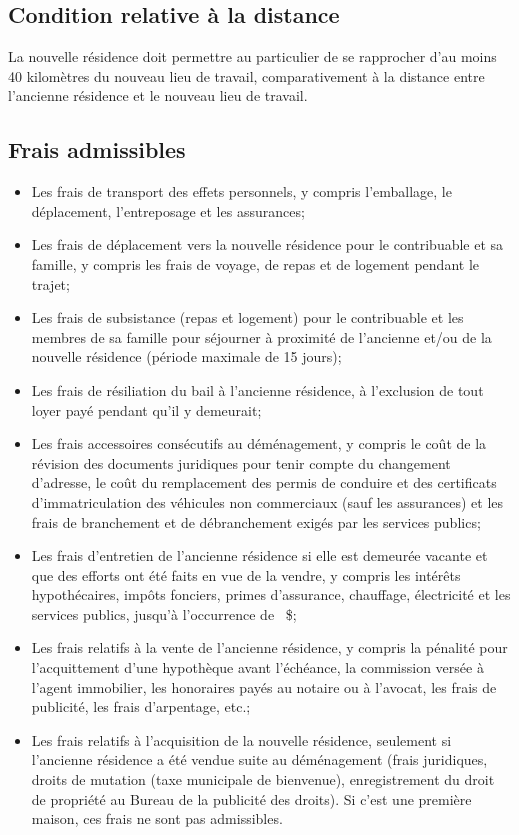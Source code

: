 \subsection{Condition relative à la distance}
La nouvelle résidence doit permettre au particulier de se rapprocher d'au moins 40 kilomètres du nouveau lieu de travail, comparativement à la distance entre l'ancienne résidence et le nouveau lieu de travail.


\subsection{Frais admissibles}
\begin{itemize}[label=]
	\item Les frais de transport des effets personnels, y compris l'emballage, le déplacement, l'entreposage et les assurances;
	\item Les frais de déplacement vers la nouvelle résidence pour le contribuable et sa famille, y compris les frais de voyage, de repas et de logement pendant le trajet;
	\item Les frais de subsistance (repas et logement) pour le contribuable et les membres de sa famille pour séjourner à proximité de l'ancienne et/ou de la nouvelle résidence (période maximale de 15 jours);
	\item Les frais de résiliation du bail à l'ancienne résidence, à l'exclusion de tout loyer payé pendant qu'il y demeurait;
	\item Les frais accessoires consécutifs au déménagement, y compris le coût de la révision des documents juridiques pour tenir compte du changement d'adresse, le coût du remplacement des permis de conduire et des certificats d'immatriculation des véhicules non commerciaux (sauf les assurances) et les frais de branchement et de débranchement exigés par les services publics;
	\item Les frais d'entretien de l'ancienne résidence si elle est demeurée vacante et que des efforts ont été faits en vue de la vendre, y compris les intérêts hypothécaires, impôts fonciers, primes d'assurance, chauffage, électricité et les services publics, jusqu'à l'occurrence de ~\$;
	\item Les frais relatifs à la vente de l'ancienne résidence, y compris la pénalité pour l'acquittement d'une hypothèque avant l'échéance, la commission versée à l'agent immobilier, les honoraires payés au notaire ou à l'avocat, les frais de publicité, les frais d'arpentage, etc.; 
	\item Les frais relatifs à l'acquisition de la nouvelle résidence, seulement si l'ancienne résidence a été vendue suite au déménagement (frais juridiques, droits de mutation (taxe municipale de bienvenue), enregistrement du droit de propriété au Bureau de la publicité des droits). Si c'est une première maison, ces frais ne sont pas admissibles.
\end{itemize}


